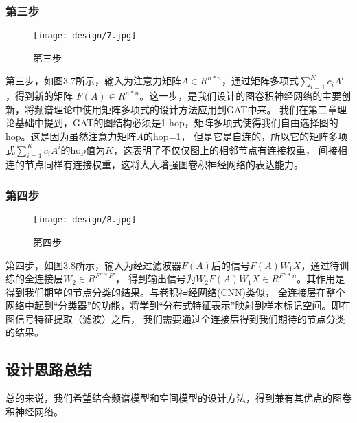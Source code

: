 \subsubsection{第三步}
\begin{figure}[ht]
    \centering
    \captionsetup{width=10cm}
    \texttt{[image: design/7.jpg]}
    \caption{\label{3-7}第三步}
\end{figure}
第三步，如图3.7所示，输入为注意力矩阵$A \in R^{n*n}$，通过矩阵多项式$ {\sum_{i=1}^{K}c_{i}A^{i}} $ ，得到新的矩阵
$F(A) \in R^{n*n}$。这一步，是我们设计的图卷积神经网络的主要创新，将频谱理论中使用矩阵多项式的设计方法应用到GAT中来。
我们在第二章理论基础中提到，GAT的图结构必须是1-hop，矩阵多项式使得我们自由选择图的hop。这是因为虽然注意力矩阵$A$的hop=1，
但是它是自连的，所以它的矩阵多项式$ {\sum_{i=1}^{K}c_{i}A^{i}} $的hop值为$K$，这表明了不仅仅图上的相邻节点有连接权重，
间接相连的节点同样有连接权重，这将大大增强图卷积神经网络的表达能力。

\subsubsection{第四步}
\begin{figure}[ht]
    \centering
    \captionsetup{width=10cm}
    \texttt{[image: design/8.jpg]}
    \caption{\label{3-8}第四步}
\end{figure}
第四步，如图3.8所示，输入为经过滤波器$ F(A) $后的信号$ F(A)W_{1}X $，通过待训练的全连接层$ W_2 \in R^{F''*F'} $，
得到输出信号为$ W_{2}F(A)W_{1}X \in R^{F''*n} $。其作用是得到我们期望的节点分类的结果。与卷积神经网络(CNN)类似，
全连接层在整个网络中起到“分类器”的功能，将学到“分布式特征表示”映射到样本标记空间。即在图信号特征提取（滤波）之后，
我们需要通过全连接层得到我们期待的节点分类的结果。

\subsection{设计思路总结}
总的来说，我们希望结合频谱模型和空间模型的设计方法，得到兼有其优点的图卷积神经网络。

